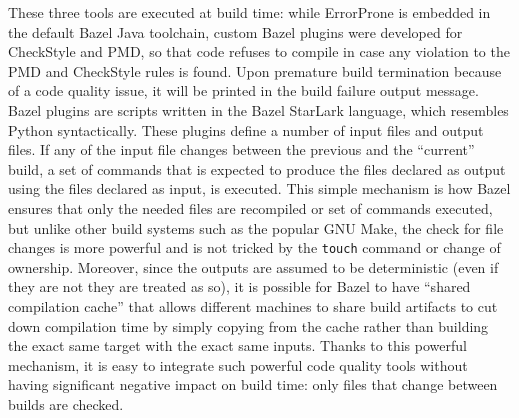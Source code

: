 \documentclass[]{usiinfbachelorproject}
\begin{document}
These three tools are executed at build time: while ErrorProne is embedded in
the default Bazel Java toolchain, custom Bazel plugins were developed for
CheckStyle and PMD, so that code refuses to compile in case any violation
to the PMD and CheckStyle rules is found. Upon premature build termination
because of a code quality issue, it will be printed in the build failure
output message.
Bazel plugins are scripts written in the Bazel StarLark language, which
resembles Python syntactically. These plugins define a number of input files
and output files. If any of the input file changes between the previous and
the ``current'' build, a set of commands that is expected to produce the files
declared as output using the files declared as input, is executed. 
This simple mechanism is how Bazel ensures that only the needed files are
recompiled or set of commands executed, but unlike other build systems such
as the popular GNU Make, the check for file changes is more powerful and is
not tricked by the \texttt{touch} command or change of ownership. Moreover,
since the outputs are assumed to be deterministic (even if they are not they are
treated as so), it is possible for Bazel to have ``shared compilation cache''
that allows different machines to share build artifacts to cut down compilation
time by simply copying from the cache rather than building the exact same
target with the exact same inputs.
Thanks to this powerful mechanism, it is easy to integrate such powerful code
quality tools without having significant negative impact on build time: only
files that change between builds are checked.

\vspace{1em}
\end{document}
